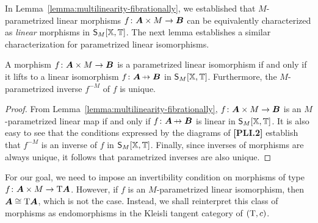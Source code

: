In Lemma~\ref{lemma:multilinearity-fibrationally}, we established that $M$-parametrized linear morphisms $f\colon{\bm{A}}\times M\to{\bm{B}}$ can be equivalently characterized as \emph{linear} morphisms in $\mathsf{S}_M[\mathbb{X},\mathbb{T}]$. The next lemma establishes a similar characterization for parametrized linear isomorphisms.

\begin{lemma}
\label{lemma:parametrized-linear-isomorphisms}
A morphism $f\colon{\bm{A}}\times M\to{\bm{B}}$ is a parametrized linear isomorphism if and only if it lifts to a linear isomorphism $f\colon\A\nto\B$ in $\mathsf{S}_M[\mathbb{X},\mathbb{T}]$. Furthermore, the $M$-parametrized inverse $f^{-M}$ of $f$ is unique.
\end{lemma}
\begin{proof}
From Lemma~\ref{lemma:multilinearity-fibrationally}, $f\colon{\bm{A}}\times M\to{\bm{B}}$ is an $M$-parametrized linear map if and only if $f\colon\A\nto\B$ is linear in $\mathsf{S}_M[\mathbb{X},\mathbb{T}]$. It is also easy to see that the conditions expressed by the diagrams of \textbf{[PLI.2]} establish that $f^{-M}$ is an inverse of $f$ in $\mathsf{S}_M[\mathbb{X},\mathbb{T}]$. Finally, since inverses of morphisms are always unique, it follows that parametrized inverses are also unique.
\end{proof}

For our goal, we need to impose an invertibility condition on morphisms of type $f\colon{\bm{A}}\times M\to\mathrm{T}{\bm{A}}$. However, if $f$ is an $M$-parametrized linear isomorphism, then ${\bm{A}}\cong\mathrm{T}{\bm{A}}$, which is not the case. Instead, we shall reinterpret this class of morphisms as endomorphisms in the Kleisli tangent category of $(\mathrm{T},c)$.


